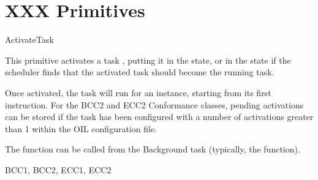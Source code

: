 \pagebreak


\section{XXX Primitives}


\pagebreak


\begin{function}{ActivateTask}
  
  \begin{fundescription}
    This primitive activates a task , putting it in the
     state, or in the  state if the
    scheduler finds that the activated task should become the running
    task.

    Once activated, the task will run for an instance, starting from
    its first instruction. For the BCC2 and ECC2 Conformance classes,
    pending activations can be stored if the task has been configured
    with a number of activations greater than 1 within the OIL
    configuration file.

    The function can be called from the Background task (typically,
    the  function).

  \end{fundescription}
  
  \begin{funparameters}
  \end{funparameters}
  
  \begin{funreturn}
  \end{funreturn}
  
  \begin{funconformance}
    BCC1, BCC2, ECC1, ECC2
  \end{funconformance}
\end{function}


\pagebreak


